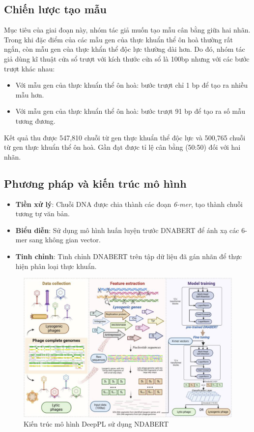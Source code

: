 \subsection*{Chiến lược tạo mẫu}
Mục tiêu của giai đoạn này, nhóm tác giả muốn tạo mẫu cân bằng giữa hai nhãn. Trong khi đặc điểm của các mẫu gen của thực khuẩn thể ôn hoà thường rất ngắn, còn mẫu gen của thực khẩn thể độc lực thường dài hơn. Do đó, nhóm tác giả dùng kĩ thuật cửa sổ trượt với kích thước cửa sổ là 100bp nhưng với các bước trượt khác nhau:
\begin{itemize}
    \item Với mẫu gen của thực khuẩn thể ôn hoà: bước trượt chỉ 1 bp để tạo ra nhiều mẫu hơn.
    \item Với mẫu gen của thực khuẩn thể ôn hoà: bước trượt 91 bp để tạo ra số mẫu tương đương.
\end{itemize}
Kết quả thu được 547{,}810 chuỗi từ gen thực khuẩn thể độc lực và 500{,}765 chuỗi từ gen thực khuẩn thể ôn hoà. Gần đạt được tỉ lệ cân bằng (50:50) đối với hai nhãn.

\subsection*{Phương pháp và kiến trúc mô hình}

\begin{itemize}
    \item \textbf{Tiền xử lý}: Chuỗi DNA được chia thành các đoạn \textit{6-mer}, tạo thành chuỗi tương tự văn bản.
    \item \textbf{Biểu diễn}: Sử dụng mô hình huấn luyện trước DNABERT để ánh xạ các 6-mer sang không gian vector.
    \item \textbf{Tinh chỉnh}: Tinh chỉnh DNABERT trên tập dữ liệu đã gán nhãn để thực hiện phân loại thực khuẩn.
\end{itemize}
\begin{figure}[H]
    \centering
    \includegraphics[width=1\linewidth]{figures/DeepPL_model.png}
    \caption{Kiến trúc mô hình DeepPL sử dụng NDABERT}
    \label{fig:DeepPL_model}
\end{figure}

